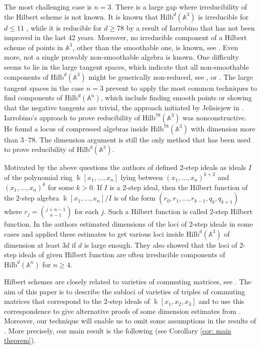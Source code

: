 \documentclass[11pt]{amsart}
\theoremstyle{definition}
\newcommand{\A}{\mathbb{A}}
\newcommand{\Hilb}[2]{\mathrm{Hilb}^{#1}(\A^{#2})}
\begin{document}
The most challenging case is $n=3$. There is a large gap where irreducibility of the Hilbert scheme is not known. It is known that $\Hilb{d}{3}$ is irreducible for $d\le 11$ \cite{DJNT}, while it is reducible for $d\ge 78$ by a result of Iarrobino \cite{Iar} that has not been improved in the last 42 years. Moreover, no irreducible component of a Hilbert scheme of points in $\A^3$, other than the smoothable one, is known, see \cite[Problem VII]{Jel - open problems}. Even more, not a single provably non-smoothable algebra is known. One difficulty seems to lie in the large tangent spaces, which indicate that all non-smoothable components of $\Hilb{d}{3}$ might be generically non-reduced, see \cite[Problem I]{Jel - open problems}, or \cite[p. 32]{GGGL}. The large tangent spaces in the case $n=3$ prevent to apply the most common techniques to find components of $\Hilb{d}{n}$, which include finding smooth points or showing that the negative tangents are trivial, the approach initiated by Jelisiejew in \cite{Jel - elementary components}.  Iarrobino's approach to prove reducibility of $\Hilb{78}{3}$ was nonconstructive. He found a locus of compressed algebras inside $\Hilb{78}{3}$ with dimension more than $3\cdot 78$. The dimension argument is still the only method that has been used to prove reducibility of $\Hilb{d}{3}$.

Motivated by the above questions the authors of \cite{GGGL} defined 2-step ideals as ideals $I$ of the polynomial ring $\Bbbk[x_1,\ldots ,x_n]$ lying between $(x_1,\ldots ,x_n)^{k+2}$ and $(x_1,\ldots ,x_n)^k$ for some $k>0$. If $I$ is a 2-step ideal, then the Hilbert function of the 2-step algebra $\Bbbk[x_1,\ldots ,x_n]/I$ is of the form $(r_0,r_1,\ldots ,r_{k-1},q_k,q_{k+1})$ where $r_j={j+n-1\choose n-1}$ for each $j$. Such a Hilbert function is called 2-step Hilbert function.  In \cite{GGGL} the authors estimated dimensions of the loci of 2-step ideals in some cases and applied these estimates to get various loci inside $\Hilb{d}{3}$ of dimension at least $3d$ if $d$ is large enough. They also showed that the loci of 2-step ideals of given Hilbert function are often irreducible components of $\Hilb{d}{n}$ for $n\ge 4$.

Hilbert schemes are closely related to varieties of commuting matrices, see \cite{GKS, HJ, JS, Nak}. The aim of this paper is to describe the subloci of varieties of triples of commuting matrices that correspond to the 2-step ideals of $\Bbbk[x_1,x_2,x_3]$ and to use this correspondence to give alternative proofs of some dimension estimates from \cite{GGGL}. Moreover, our technique will enable us to omit some assumptions in the results of \cite{GGGL}. More precisely, our main result is the following (see Corollary \ref{cor: main theorem}).
\end{document}
